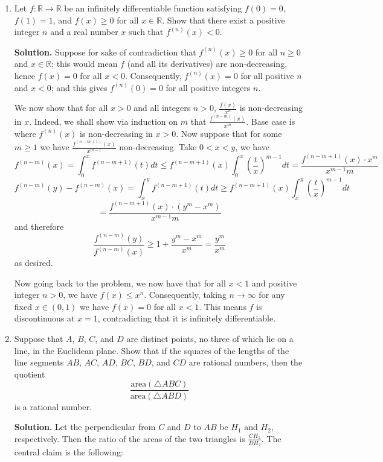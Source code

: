 \documentclass[11pt,a4paper]{article}
\newcommand{\<}{\langle}
\renewcommand{\>}{\rangle}
\begin{document}
\begin{enumerate}
	\item [\textbf{A5}]
	Let $f: \mathbb{R} \to \mathbb{R}$ be an infinitely differentiable function satisfying $f(0) = 0$, $f(1) = 1$, and $f(x) \ge 0$ for all $x \in \mathbb{R}$. Show that there exist a positive integer $n$ and a real number $x$ such that $f^{(n)}(x) < 0$.
	
	\textbf{Solution.} 
	Suppose for sake of contradiction that $f^{(n)}(x)\ge 0$ for all $n\ge 0$ and $x\in\mathbb{R}$; 
	this would mean $f$ (and all its derivatives) are non-decreasing, 
	hence $f(x)=0$ for all $x < 0$. Consequently, $f^{(n)}(x) = 0$ for all positive $n$ and $x < 0$; 
	and this gives $f^{(n)}(0) = 0$ for all positive integers $n$. 
	
	We now show that for all $x > 0$ and all integers $n > 0$, $\frac{f(x)}{x^n}$ is non-decreasing in $x$. 
	Indeed, we shall show via induction on $m$ that $\frac{f^{(n - m)}(x)}{x^m}$. 
	Base case is where $f^{(n)}(x)$ is non-decreasing in $x > 0$. 
	Now suppose that for some $m\ge 1$ we have $\frac{f^{(n - m + 1)}(x)}{x^{m - 1}}$ non-decreasing. 
	Take $0 < x < y$, we have  
	\[
	f^{(n-m)}(x)=\int_0^x f^{(n - m + 1)}(t)dt\le f^{(n-m+1)}(x)\int_0^x \left(\frac{t}{x}\right)^{m-1}dt
	=\frac{f^{(n-m+1)}(x)\cdot x^m}{x^{m-1}m}
	\]
	\[
	f^{(n-m)}(y)-f^{(n-m)}(x)=\int_x^y f^{(n - m + 1)}(t)dt\ge f^{(n-m+1)}(x)\int_x^y \left(\frac{t}{x}\right)^{m-1}dt
	\]
	\[
	=\frac{f^{(n-m+1)}(x)\cdot (y^m-x^m)}{x^{m-1}m}
	\]
	and therefore 
	\[
	\frac{f^{(n-m)}(y)}{f^{(n-m)}(x)}\ge 1 + \frac{y^m-x^m}{x^m}=\frac{y^m}{x^m}
	\]
	as desired. 
	
	Now going back to the problem, we now have that for all $x < 1$ and positive integer $n > 0$, we have $f(x)\le x^n$. 
	Consequently, taking $n\to\infty$ for any fixed $x\in (0, 1)$ we have $f(x)=0$ for all $x < 1$. 
	This means $f$ is discontinuous at $x=1$, contradicting that it is infinitely differentiable. 
	
	\item [\textbf{A6}] 
	Suppose that $A$, $B$, $C$, and $D$ are distinct points, no three of which lie on a line, in the Euclidean plane. Show that if the squares of the lengths of the line segments $AB$, $AC$, $AD$, $BC$, $BD$, and $CD$ are rational numbers, then the quotient
	\[\frac{\mathrm{area}(\triangle ABC)}{\mathrm{area}(\triangle ABD)}\]is a rational number.
	
	\textbf{Solution.} Let the perpendicular from $C$ and $D$ to $AB$ be $H_1$ and $H_2$, respectively. Then the ratio of the areas of the two triangles is $\frac{CH_1}{DH_2}$. The central claim is the following: 
	

\end{enumerate}
\end{document}
